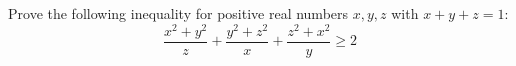 Prove the following inequality for positive real numbers $x,y,z$ with $x+y+z=1$:
$$\frac{x^2+y^2}{z}+\frac{y^2+z^2}{x}+\frac{z^2+x^2}{y}\geq 2$$
